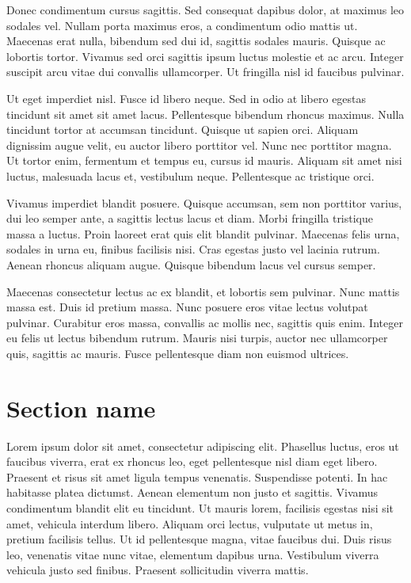 Donec condimentum cursus sagittis. Sed consequat dapibus dolor, at maximus leo sodales vel. Nullam porta maximus eros, a condimentum odio mattis ut. Maecenas erat nulla, bibendum sed dui id, sagittis sodales mauris. Quisque ac lobortis tortor. Vivamus sed orci sagittis ipsum luctus molestie et ac arcu. Integer suscipit arcu vitae dui convallis ullamcorper. Ut fringilla nisl id faucibus pulvinar.

Ut eget imperdiet nisl. Fusce id libero neque. Sed in odio at libero egestas tincidunt sit amet sit amet lacus. Pellentesque bibendum rhoncus maximus. Nulla tincidunt tortor at accumsan tincidunt. Quisque ut sapien orci. Aliquam dignissim augue velit, eu auctor libero porttitor vel. Nunc nec porttitor magna. Ut tortor enim, fermentum et tempus eu, cursus id mauris. Aliquam sit amet nisi luctus, malesuada lacus et, vestibulum neque. Pellentesque ac tristique orci.

Vivamus imperdiet blandit posuere. Quisque accumsan, sem non porttitor varius, dui leo semper ante, a sagittis lectus lacus et diam. Morbi fringilla tristique massa a luctus. Proin laoreet erat quis elit blandit pulvinar. Maecenas felis urna, sodales in urna eu, finibus facilisis nisi. Cras egestas justo vel lacinia rutrum. Aenean rhoncus aliquam augue. Quisque bibendum lacus vel cursus semper.

Maecenas consectetur lectus ac ex blandit, et lobortis sem pulvinar. Nunc mattis massa est. Duis id pretium massa. Nunc posuere eros vitae lectus volutpat pulvinar. Curabitur eros massa, convallis ac mollis nec, sagittis quis enim. Integer eu felis ut lectus bibendum rutrum. Mauris nisi turpis, auctor nec ullamcorper quis, sagittis ac mauris. Fusce pellentesque diam non euismod ultrices.

\section{Section name}
Lorem ipsum dolor sit amet, consectetur adipiscing elit. Phasellus luctus, eros ut faucibus viverra, erat ex rhoncus leo, eget pellentesque nisl diam eget libero. Praesent et risus sit amet ligula tempus venenatis. Suspendisse potenti. In hac habitasse platea dictumst. Aenean elementum non justo et sagittis. Vivamus condimentum blandit elit eu tincidunt. Ut mauris lorem, facilisis egestas nisi sit amet, vehicula interdum libero. Aliquam orci lectus, vulputate ut metus in, pretium facilisis tellus. Ut id pellentesque magna, vitae faucibus dui. Duis risus leo, venenatis vitae nunc vitae, elementum dapibus urna. Vestibulum viverra vehicula justo sed finibus. Praesent sollicitudin viverra mattis.

